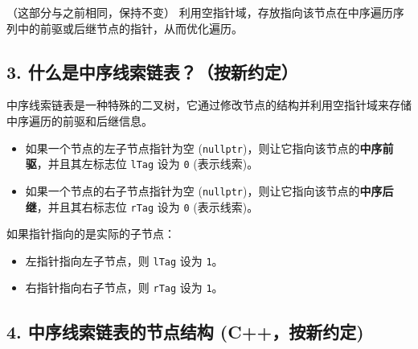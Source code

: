 （这部分与之前相同，保持不变）
利用空指针域，存放指向该节点在中序遍历序列中的前驱或后继节点的指针，从而优化遍历。

\subsection{3. 什么是中序线索链表？（按新约定）}

中序线索链表是一种特殊的二叉树，它通过修改节点的结构并利用空指针域来存储中序遍历的前驱和后继信息。

\begin{itemize}
	\item 如果一个节点的左子节点指针为空 (\lstinline{nullptr})，则让它指向该节点的\textbf{中序前驱}，并且其左标志位 \lstinline{lTag} 设为 \lstinline{0} (表示线索)。
	\item 如果一个节点的右子节点指针为空 (\lstinline{nullptr})，则让它指向该节点的\textbf{中序后继}，并且其右标志位 \lstinline{rTag} 设为 \lstinline{0} (表示线索)。
\end{itemize}

如果指针指向的是实际的子节点：

\begin{itemize}
	\item 左指针指向左子节点，则 \lstinline{lTag} 设为 \lstinline{1}。
	\item 右指针指向右子节点，则 \lstinline{rTag} 设为 \lstinline{1}。
\end{itemize}

\subsection{4. 中序线索链表的节点结构 (C++，按新约定)}

